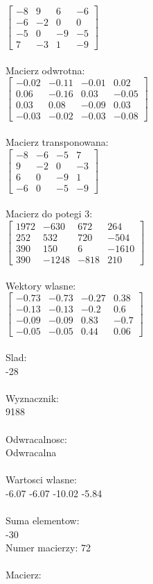 \documentclass[a4paper,12pt]{article}
\begin{document}
$\begin{bmatrix} -8&9&6&-6\\-6&-2&0&0\\-5&0&-9&-5\\7&-3&1&-9 \end{bmatrix}$
\\
\\
Macierz odwrotna:\\

$\begin{bmatrix} -0.02&-0.11&-0.01&0.02\\0.06&-0.16&0.03&-0.05\\0.03&0.08&-0.09&0.03\\-0.03&-0.02&-0.03&-0.08 \end{bmatrix}$
\\
\\
Macierz transponowana:\\

$\begin{bmatrix} -8&-6&-5&7\\9&-2&0&-3\\6&0&-9&1\\-6&0&-5&-9 \end{bmatrix}$
\\
\\
Macierz do potegi 3:\\

$\begin{bmatrix} 1972&-630&672&264\\252&532&720&-504\\390&150&6&-1610\\390&-1248&-818&210 \end{bmatrix}$
\\
\\
Wektory wlasne:\\

$\begin{bmatrix} -0.73&-0.73&-0.27&0.38\\-0.13&-0.13&-0.2&0.6\\-0.09&-0.09&0.83&-0.7\\-0.05&-0.05&0.44&0.06 \end{bmatrix}$
\\
\\
Slad:\\
-28
\\
\\
Wyznacznik:\\
9188
\\
\\
Odwracalnosc:\\
Odwracalna
\\
\\
Wartosci wlasne:\\
-6.07 -6.07 -10.02 -5.84
\\
\\
Suma elementow:\\
-30
\\
\newpage
Numer macierzy:
72
\\
\\
Macierz:\\
\end{document}
